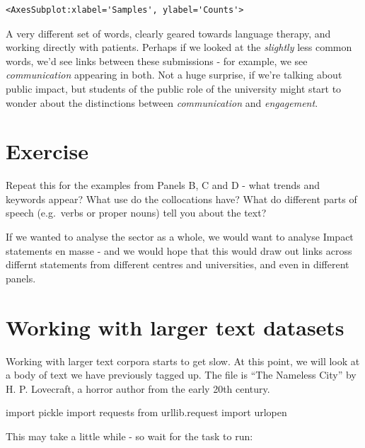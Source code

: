 \documentclass[
  letterpaper,
  DIV=11,
  numbers=noendperiod]{scrreprt}
\newenvironment{Shaded}{\begin{snugshade}}{\end{snugshade}}
\newcommand{\ImportTok}[1]{\textcolor[rgb]{0.00,0.46,0.62}{#1}}
\newcommand{\NormalTok}[1]{\textcolor[rgb]{0.00,0.23,0.31}{#1}}
\begin{document}
\begin{verbatim}
<AxesSubplot:xlabel='Samples', ylabel='Counts'>
\end{verbatim}

A very different set of words, clearly geared towards language therapy,
and working directly with patients. Perhaps if we looked at the
\emph{slightly} less common words, we'd see links between these
submissions - for example, we see \emph{communication} appearing in
both. Not a huge surprise, if we're talking about public impact, but
students of the public role of the university might start to wonder
about the distinctions between \emph{communication} and
\emph{engagement}.

\hypertarget{exercise-10}{%
\section{Exercise}\label{exercise-10}}

Repeat this for the examples from Panels B, C and D - what trends and
keywords appear? What use do the collocations have? What do different
parts of speech (e.g.~verbs or proper nouns) tell you about the text?

If we wanted to analyse the sector as a whole, we would want to analyse
Impact statements en masse - and we would hope that this would draw out
links across differnt statements from different centres and
universities, and even in different panels.

\hypertarget{working-with-larger-text-datasets}{%
\section{Working with larger text
datasets}\label{working-with-larger-text-datasets}}

Working with larger text corpora starts to get slow. At this point, we
will look at a body of text we have previously tagged up. The file is
``The Nameless City'' by H. P. Lovecraft, a horror author from the early
20th century.

\begin{Shaded}
\begin{Highlighting}[]
\ImportTok{import}\NormalTok{ pickle}
\ImportTok{import}\NormalTok{ requests}
\ImportTok{from}\NormalTok{ urllib.request }\ImportTok{import}\NormalTok{ urlopen}
\end{Highlighting}
\end{Shaded}

This may take a little while - so wait for the task to run:
\end{document}
